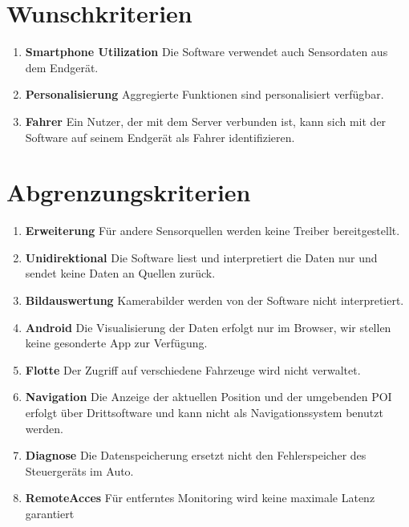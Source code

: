 \documentclass[pflichtenheft.tex]{subfiles}
\begin{document}
\renewcommand{\theenumi}{/WK\ifnum \value{enumi}<10 0\fi\arabic{enumi}0/}
\renewcommand{\labelenumi}{\theenumi}
\renewcommand{\theenumii}{\arabic{enumii}}
\renewcommand{\labelenumii}{/WK\ifnum \value{enumi}<10 0\fi\arabic{enumi}\arabic{enumii}/}
\section{Wunschkriterien}

\begin{enumerate}
\item{\textbf{Smartphone Utilization}} Die Software verwendet auch Sensordaten aus dem Endgerät.

\item{\textbf{Personalisierung}} Aggregierte Funktionen sind personalisiert verfügbar.

\item{\textbf{Fahrer}} Ein Nutzer, der mit dem Server verbunden ist, kann sich mit der Software auf seinem Endgerät als Fahrer identifizieren.
\end{enumerate}

\renewcommand{\theenumi}{/AK\ifnum \value{enumi}<10 0\fi\arabic{enumi}0/}
\renewcommand{\labelenumi}{\theenumi}
\renewcommand{\theenumii}{\arabic{enumii}}
\renewcommand{\labelenumii}{/AK\ifnum \value{enumi}<10 0\fi\arabic{enumi}\arabic{enumii}/}

\section{Abgrenzungskriterien}

\begin{enumerate}
\item{\textbf{Erweiterung}} Für andere Sensorquellen werden keine Treiber bereitgestellt.

\item{\textbf{Unidirektional}} Die Software liest und interpretiert die Daten nur und sendet keine Daten an Quellen zurück.

\item{\textbf{Bildauswertung}} Kamerabilder werden von der Software nicht interpretiert.

\item{\textbf{Android}} Die Visualisierung der Daten erfolgt nur im Browser, wir stellen keine gesonderte App zur Verfügung.

\item{\textbf{Flotte}} Der Zugriff auf verschiedene Fahrzeuge wird nicht verwaltet.

\item{\textbf{Navigation}} Die Anzeige der aktuellen Position und der umgebenden POI erfolgt über Drittsoftware und kann nicht als Navigationssystem benutzt werden.

\item{\textbf{Diagnose}} Die Datenspeicherung ersetzt nicht den Fehlerspeicher des Steuergeräts im Auto.

\item{\textbf{RemoteAcces}} Für entferntes Monitoring wird keine maximale Latenz garantiert 

\end{enumerate}
\end{document}
